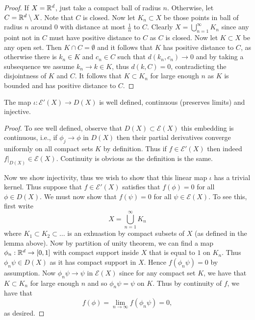 \documentclass[twoside, a4paper, 10pt]{amsart}
\begin{document}
\begin{proof} If $X = \mathbb{R}^d$, just take a compact ball of radius $n$. Otherwise, let $C = \mathbb{R}^d \setminus X$. Note that $C$ is closed. Now let $K_n \subset X$ be those points in ball of radius $n$ around $0$ with distance at most $\frac{1}{n}$ to $C$. Clearly $X = \bigcup_{n=1}^{\infty} K_n$ since any point not in $C$ must have positive distance to $C$ as $C$ is closed. Now let $K \subset X$ be any open set. Then $K \cap C = \emptyset$ and it follows that $K$ has positive distance to $C$, as otherwise there is $k_n \in K$ and $c_n \in C$ such that $d(k_n, c_n) \to 0$ and by taking a subsequence we assume $k_n \to k \in K$, thus $d(k, C) = 0$, contradicting the disjointness of $K$ and $C$. It follows that $K \subset K_n$ for large enough $n$ as $K$ is bounded and has positive distance to $C$.

\end{proof}

\begin{lemma} The map $\iota:\mathcal{E}'(X) \to D(X)$ is well defined, continuous (preserves limits) and injective.

\end{lemma}

\begin{proof} To see well defined, observe that $D(X) \subset \mathcal{E}(X)$ this embedding is continuous, i.e., if $\phi_j \to \phi$ in $D(X)$ then their partial derivatives converge uniformly on all compact sets $K$ by definition. Thus if $f \in \mathcal{E}'(X)$ then indeed $f|_{D(X)} \in \mathcal{E}(X)$. Continuity is obvious as the definition is the same. 

Now we show injectivity, thus we wish to show that this linear map $\iota$ has a trivial kernel. Thus suppose that $f \in \mathcal{E}'(X)$ satisfies that $f(\phi) = 0$ for all $\phi \in D(X)$. We must now show that $f(\psi) = 0$ for all $\psi \in \mathcal{E}(X)$. To see this, first write $$X = \bigcup_{n=1}^{\infty} K_n$$ where $K_1 \subset K_2 \subset \ldots$ is an exhuastion by compact subsets of $X$ (as defined in the lemma above). Now by partition of unity theorem, we can find a map $\phi_n:\mathbb{R}^d \to [0,1]$ with compact support inside $X$ that is equal to $1$ on $K_n$.  Thus $\phi_n \psi \in D(X)$ as it has compact support in $X$. Hence $f(\phi_n \psi) = 0$ by assumption. Now $\phi_n\psi \to \psi$ in $\mathcal{E}(X)$ since for any compact set $K$, we have that $K \subset K_n$ for large enough $n$ and so $\phi_n\psi = \psi$ on $K$. Thus by continuity of $f$, we have that $$f(\phi) = \lim_{n \to \infty} f(\phi_n \psi) = 0,$$ as desired. \end{proof}
\end{document}
